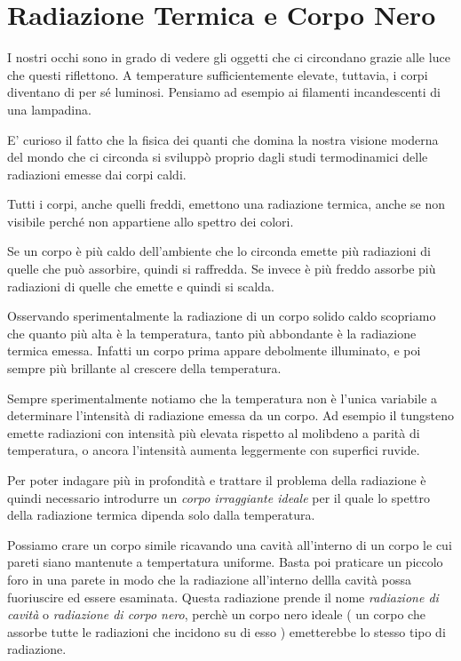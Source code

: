 \documentclass[12pt,twoside]{report}
\begin{document}
\section{Radiazione Termica e Corpo Nero}
\par{I nostri occhi sono in grado di vedere gli oggetti che ci circondano grazie alle luce che questi riflettono. A temperature sufficientemente elevate, tuttavia, i corpi diventano di per sé luminosi. Pensiamo ad esempio ai filamenti incandescenti di una lampadina.}
\par{E' curioso il fatto che la fisica dei quanti che domina la nostra visione moderna del mondo che ci circonda si sviluppò proprio dagli studi termodinamici delle radiazioni emesse dai corpi caldi.}
\par{Tutti i corpi, anche quelli freddi, emettono una radiazione termica, anche se non visibile perché non appartiene allo spettro dei colori.}
\par{Se un corpo è più caldo dell'ambiente che lo circonda emette più radiazioni di quelle che può assorbire, quindi si raffredda. Se invece è più freddo assorbe più radiazioni di quelle che emette e quindi si scalda.}
\par{Osservando sperimentalmente la radiazione di un corpo solido caldo scopriamo che quanto più alta è la temperatura, tanto più abbondante è la radiazione termica emessa. Infatti un corpo prima appare debolmente illuminato, e poi sempre più brillante al crescere della temperatura.}
\par{Sempre sperimentalmente notiamo che la temperatura non è l'unica variabile a determinare l'intensità di radiazione emessa da un corpo. Ad esempio il tungsteno emette radiazioni con intensità più elevata rispetto al molibdeno a parità di temperatura, o ancora l'intensità aumenta leggermente con superfici ruvide.}
\par{Per poter indagare più in profondità e trattare il problema della radiazione è quindi necessario introdurre un \textit{corpo irraggiante ideale} per il quale lo spettro della radiazione termica dipenda solo dalla temperatura.}

\par{Possiamo crare un corpo simile ricavando una cavità all'interno di un corpo le cui pareti siano mantenute a tempertatura uniforme. Basta poi praticare un piccolo foro in una parete in modo che la radiazione all'interno dellla cavità possa fuoriuscire ed essere esaminata. Questa radiazione prende il nome \textit{radiazione di cavità} o \textit{radiazione di corpo nero}, perchè un corpo nero ideale ( un corpo che assorbe tutte le radiazioni che incidono su di esso ) emetterebbe lo stesso tipo di radiazione.}
\end{document}
